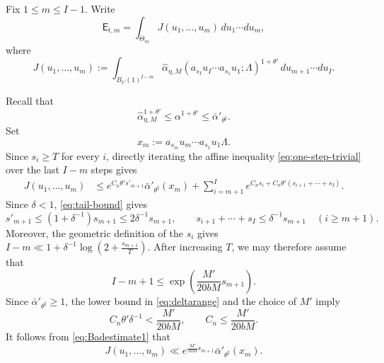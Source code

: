 \documentclass[reqno,11pt]{amsart}
\numberwithin{equation}{section}
\theoremstyle{definition}
\theoremstyle{remark}
\begin{document}
\medskip
{}
Fix $1\le m\le I-1$. Write
$$
\mathsf E_{t,m}
=
\int_{\overline\Theta_m}
J(u_1,\dots,u_m)\,du_1\cdots du_m,
$$
where
$$
J(u_1,\dots,u_m)
:=
\int_{B_{U}(1)^{I-m}}
\widehat\alpha_{\eta,M}(a_{s_I}u_I\cdots a_{s_1}u_1;\Lambda)^{1+\theta'}
\,du_{m+1}\cdots du_I.
$$


Recall that
$$
\widehat\alpha_{\eta,M}^{1+\theta'}
\le \alpha^{1+\theta'}\leq \bar{\alpha}'_{\theta^{\sharp}}.
$$
Set
$$
x_m:=a_{s_m}u_m\cdots a_{s_1}u_1\Lambda.
$$
Since $s_i\ge T$ for every $i$, directly iterating the affine inequality
\eqref{eq:one-step-trivial} over the last $I-m$ steps gives
\begin{equation}\label{eq:Badestimate1}
\begin{aligned}
J(u_1,\dots,u_m)
&\le
e^{C_n\theta's'_{m+1}}\bar\alpha'_{\theta^{\sharp}}(x_m)+
\sum_{i=m+1}^I
e^{C_ns_i+C_n\theta'(s_{i+1}+\cdots+s_I)}.
\end{aligned}
\end{equation}
Since $\delta<1$, \eqref{eq:tail-bound} gives
$$
s'_{m+1}\le(1+\delta^{-1})s_{m+1}\le2\delta^{-1}s_{m+1},
\qquad
s_{i+1}+\cdots+s_I\le\delta^{-1}s_{m+1}
\quad(i\ge m+1).
$$
Moreover, the geometric definition of the $s_i$ gives
$I-m\ll1+\delta^{-1}\log(2+\frac{s_{m+1}}{T})$. After increasing $T$, we may therefore
assume that
$$
I-m+1\le \exp\left(\frac{M'}{20bM}s_{m+1}\right).
$$
Since $\bar\alpha'_{\theta^{\sharp}}\ge1$, the lower bound in
\eqref{eq:deltarange} and the choice of $M'$ imply
$$
C_n\theta'\delta^{-1}<\frac{M'}{20bM},
\qquad
C_n\le\frac{M'}{20bM}.
$$
It follows from \eqref{eq:Badestimate1} that
\begin{equation}\label{eq:Badestimate1-simplified}
J(u_1,\ldots,u_m)
\ll
e^{\frac{M'}{5bM}s_{m+1}}
\bar\alpha'_{\theta^{\sharp}}(x_m).
\end{equation}
\end{document}

